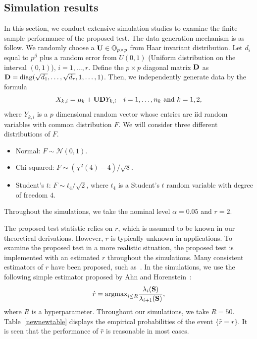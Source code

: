 \documentclass[times,sort&compress,3p]{elsarticle}
\newcommand{\mydiag}{ {\rm diag} }
\theoremstyle{plain}
\theoremstyle{definition}
\theoremstyle{remark}
\begin{document}
\subsection{Simulation results}

In this section, we conduct extensive simulation studies to examine the finite sample performance of the proposed test.
The data generation mechanism is as follow.
We randomly choose a $\mathbf{U}\in\mathbb{O}_{p\times p}$ from Haar invariant distribution.
Let $d_{i}$ equal to $p^{\beta}$ plus a random error from $U(0,1)$ (Uniform distribution on the interval $(0,1)$), $i=1,\ldots, r$.
Define the $p\times p$ diagonal matrix $\mathbf{D}$ as $\BD=\mydiag(\sqrt{d_1},\ldots,\sqrt{d_r}, 1,\ldots, 1)$.
Then, we independently generate data by the formula
$$
X_{k,i}=\mu_k+\mathbf{U} \mathbf{D} Y_{k,i}\quad \text{$i=1,\ldots,n_k$ and $k=1,2$,}
$$
where $Y_{k,i}$ is a $p$ dimensional random vector whose entries are iid random variables with common distribution $F$.
We will consider three different distributions of $F$.
\begin{itemize}
    \item
        Normal: $F \sim \mathcal{N}(0,1)$.
    \item
        Chi-squared:  $F\sim (\chi^2(4)-4)/\sqrt{8}$.
    \item
        Student's $t$: $F\sim t_4/\sqrt{2}$, where $t_4$ is a Student's $t$ random variable  with degree of freedom $4$.
\end{itemize}
Throughout the simulations, we take the nominal level $\alpha=0.05$ and $r=2$.


The proposed test statistic relies on $r$, which is assumed to be known in our theoretical derivations.
However, $r$ is typically unknown in applications.
To examine the proposed test in a more realistic situation, the proposed test is implemented with an estimated $r$ throughout the simulations.
Many consistent estimators of $r$ have been proposed, such as~\cite{Ahn2009Eigenvalue,Bai2002,Cai2015Optimal}.
In the simulations, we use the following simple estimator proposed by Ahn and Horenstein~\cite{Ahn2009Eigenvalue}:
\begin{equation}\label{rEstimate}
    \hat{r}=\textrm{argmax}_{i\leq R}\frac{\lambda_i(\mathbf{S})}{\lambda_{i+1}(\mathbf{S})},
\end{equation}
where $R$ is a hyperparameter. Throughout our simulations, we take $R=50$.
Table~\ref{newnewtable} displays the empirical probabilities of the event $\{\hat{r}=r\}$.
It is seen that the performance of $\hat{r}$ is reasonable in most cases.
\end{document}
